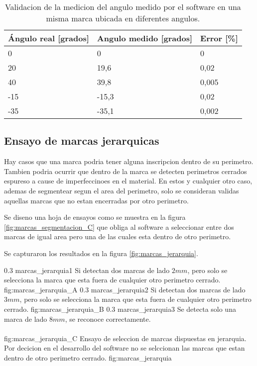       \begin{table}[!ht]
         \centering
         \caption[Ensayo de medicion de angulos de marcas]{Validacion de la medicion del angulo medido por el software en una misma marca ubicada en diferentes angulos.}
         \begin{tabular}[!ht]{m{1.6cm}m{1.6cm}m{1.6cm}}
            \toprule
            \textbf{Ángulo real [grados]} & \textbf{Angulo medido [grados]} & \textbf{Error [\%]}\\
            \midrule
            {0}   & {0}     & {0}\\
            {20}  & {19,6}  & {0,02}\\
            {40}  & {39,8}  & {0,005}\\
            {-15} & {-15,3} & {0,02}\\
            {-35} & {-35,1} & {0,002}\\
            \bottomrule
         \end{tabular}
         \label{tbl:marcas_angulos}
      \end{table}

\subsection{Ensayo de marcas jerarquicas}
\label{subsection:marcas_jerarquias}

Hay casos que una marca podria tener alguna inscripcion dentro de su perimetro. Tambien podria ocurrir que dentro de la marca se detecten perimetros cerrados espureso a cause de imperfeccinoes en el material. En estos y cualquier otro caso, ademas de segmentear segun el area del perimetro, solo se consideran validas aquellas marcas que no estan encerradas por otro perimetro. \par
Se diseno una hoja de ensayos como se muestra en la figura \ref{fig:marcas_segmentacion_C} que obliga al software a seleccionar entre dos marcas de igual area pero una de las cuales esta dentro de otro perimetro.\par
   Se capturaron los resultados en la figura \ref{fig:marcas_jerarquia}.

   \subfigabc
   {0.3} {marcas_jerarquia1} {Si detectan dos marcas de lado $2mm$, pero solo se selecciona la marca que esta fuera de cualquier otro perimetro cerrado.} {fig:marcas_jerarquia_A}
   {0.3} {marcas_jerarquia2} {Si detectan dos marcas de lado $3mm$, pero solo se selecciona la marca que esta fuera de cualquier otro perimetro cerrado.} {fig:marcas_jerarquia_B}
   {0.3} {marcas_jerarquia3} {Se detecta solo una marca de lado $8mm$, se reconoce correctamente.\\ \vphantom{1}\\ \vphantom{1}} {fig:marcas_jerarquia_C}
   {Ensayo de seleccion de marcas dispuestas en jerarquia. Por decicion en el desarrollo del software no se selccionan las marcas que estan dentro de otro perimetro cerrado.}
   {fig:marcas_jerarquia}


